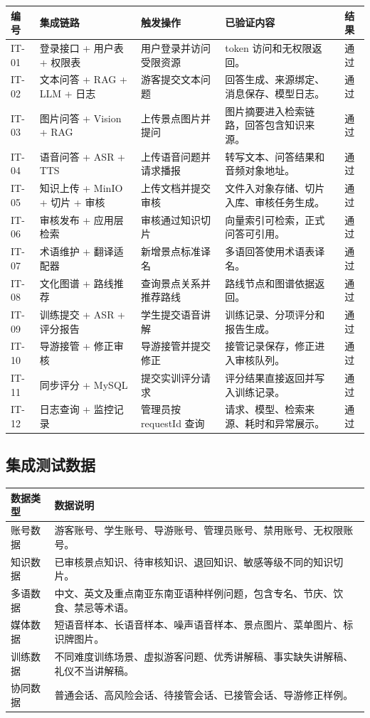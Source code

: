 \begin{longtable}{p{1.2cm}p{3.1cm}p{3.3cm}p{4.0cm}p{1.2cm}}
\toprule
编号 & 集成链路 & 触发操作 & 已验证内容 & 结果 \\
\midrule
IT-01 & 登录接口 + 用户表 + 权限表 & 用户登录并访问受限资源 & token 访问和无权限返回。 & 通过 \\
IT-02 & 文本问答 + RAG + LLM + 日志 & 游客提交文本问题 & 回答生成、来源绑定、消息保存、模型日志。 & 通过 \\
IT-03 & 图片问答 + Vision + RAG & 上传景点图片并提问 & 图片摘要进入检索链路，回答包含知识来源。 & 通过 \\
IT-04 & 语音问答 + ASR + TTS & 上传语音问题并请求播报 & 转写文本、问答结果和音频对象地址。 & 通过 \\
IT-05 & 知识上传 + MinIO + 切片 + 审核 & 上传文档并提交审核 & 文件入对象存储、切片入库、审核任务生成。 & 通过 \\
IT-06 & 审核发布 + 应用层检索 & 审核通过知识切片 & 向量索引可检索，正式问答可引用。 & 通过 \\
IT-07 & 术语维护 + 翻译适配器 & 新增景点标准译名 & 多语回答使用术语表译名。 & 通过 \\
IT-08 & 文化图谱 + 路线推荐 & 查询景点关系并推荐路线 & 路线节点和图谱依据返回。 & 通过 \\
IT-09 & 训练提交 + ASR + 评分报告 & 学生提交语音讲解 & 训练记录、分项评分和报告生成。 & 通过 \\
IT-10 & 导游接管 + 修正审核 & 导游接管并提交修正 & 接管记录保存，修正进入审核队列。 & 通过 \\
IT-11 & 同步评分 + MySQL & 提交实训评分请求 & 评分结果直接返回并写入训练记录。 & 通过 \\
IT-12 & 日志查询 + 监控记录 & 管理员按 requestId 查询 & 请求、模型、检索来源、耗时和异常展示。 & 通过 \\
\bottomrule
\end{longtable}

\subsection{集成测试数据}

\begin{longtable}{p{3.2cm}p{10.2cm}}
\toprule
数据类型 & 数据说明 \\
\midrule
账号数据 & 游客账号、学生账号、导游账号、管理员账号、禁用账号、无权限账号。 \\
知识数据 & 已审核景点知识、待审核知识、退回知识、敏感等级不同的知识切片。 \\
多语数据 & 中文、英文及重点南亚东南亚语种样例问题，包含专名、节庆、饮食、禁忌等术语。 \\
媒体数据 & 短语音样本、长语音样本、噪声语音样本、景点图片、菜单图片、标识牌图片。 \\
训练数据 & 不同难度训练场景、虚拟游客问题、优秀讲解稿、事实缺失讲解稿、礼仪不当讲解稿。 \\
协同数据 & 普通会话、高风险会话、待接管会话、已接管会话、导游修正样例。 \\
\bottomrule
\end{longtable}

